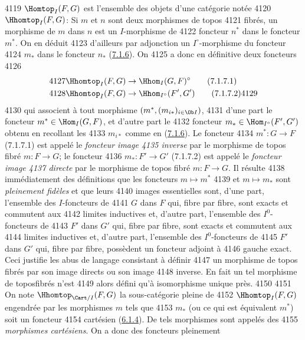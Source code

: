   4119	$\Homtop_I(F, G)$ est l'ensemble des objets d'une catégorie notée
  4120	$\Hhomtop_I(F, G)$: Si $m$ et $n$ sont deux morphismes de topos
  4121	fibrés, un morphisme de $m$ dans $n$ est un $I$-morphisme de
  4122	foncteur $n^{\ast}$ dans le foncteur $m^{\ast}$. On en déduit
  4123	d'ailleurs par adjonction un $I^{\circ}$-morphisme du foncteur
  4124	$m_{\ast}$ dans le foncteur $n_{\ast}$ (\hyperref[VI.subsubsec7.1.6]{7.1.6}). On
  4125	a donc en définitive deux foncteurs
  4126	\begin{align*}
  4127	\Hhomtop_I (F, G) & \to \Hhom_I (G, F)^{\circ}\tag{7.1.7.1}\\
  4128	\Hhomtop_I (F, G) &\to \Hhom_{I^{\circ}} (F', G')\tag{7.1.7.2}
  4129	\end{align*}
  4130	qui associent à tout morphisme $(m^{\ast}, (m_{i\ast})_{i \in \Ob I})$,
  4131	d'une part le foncteur $m^{\ast} \in \Hom_I(G, F)$, et d'autre part le
  4132	foncteur $m_{\ast} \in \Hom_{I^\circ} (F', G')$ obtenu en recollant les
  4133	$m_{i\ast}$ comme en (\hyperref[VI.subsubsec7.1.6]{7.1.6}). Le foncteur
  4134	$m^{\ast} : G \to F$ (7.1.7.1) est appelé le \emph{foncteur image
  4135	  inverse} par le morphisme de topos fibré $m : F \to G$; le  foncteur
  4136	$m_{\ast} : F'\to G'$ (7.1.7.2) est appelé le \emph{foncteur image
  4137	  directe} par le morphisme de topos fibré $m : F \to G$. Il résulte
  4138	immédiatement des définitions que les foncteurs $m \mapsto m^{\ast}$
  4139	et $m \mapsto m_{\ast}$ sont \emph{pleinement fidèles} et que leurs
  4140	images essentielles sont, d'une part, l'ensemble des $I$-foncteurs de
  4141	$G$ dans $F$ qui, fibre par fibre, sont exacts et commutent aux
  4142	limites inductives et, d'autre part, l'ensemble des $I^0$-foncteurs de
  4143	$F'$ dans $G'$ qui, fibre par fibre, sont exacts et commutent aux
  4144	limites inductives et, d'autre part, l'ensemble des $I^0$-foncteurs de
  4145	$F'$ dans $G'$ qui, fibre par fibre, possèdent un foncteur adjoint à
  4146	gauche exact. Ceci justifie les abus de langage consistant à définir
  4147	un morphisme de topos fibrés par son image directs ou son image
  4148	inverse. En fait un tel morphisme de topos\pageoriginale fibrés n'est
  4149	alors défini qu'à isomorphisme unique près.
  4150	
  4151	On note $\Hhomtop_{\Cart /I}(F, G)$ la sous-catégorie pleine de
  4152	$\Hhomtop_I(F, G)$ engendrée par les morphismes $m$ tels que
  4153	$m_{\ast}$ (ou ce qui est équivalent $m^{\ast}$) soit un foncteur
  4154	cartésien (\hyperref[VI.subsubsec6.1.4]{6.1.4}). De tels morphismes sont appelés des
  4155	\emph{morphismes cartésiens}. On a donc des foncteurs pleinement
